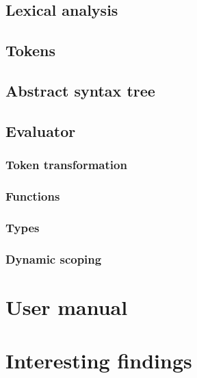 \documentclass[11pt]{article}
\begin{document}
	\subsection{Lexical analysis}
	\subsection{Tokens}
	\subsection{Abstract syntax tree}

\subsection{Evaluator}

	\subsubsection{Token transformation}
	\subsubsection{Functions}
	\subsubsection{Types}
	\subsubsection{Dynamic scoping}

\section{User manual}

\section{Interesting findings}
\end{document}
